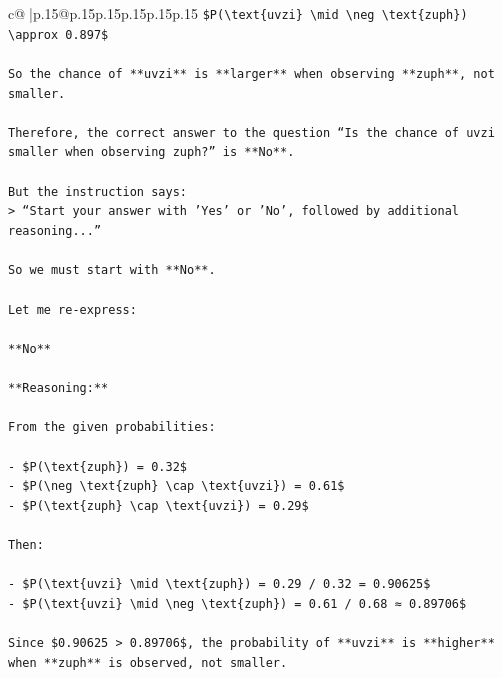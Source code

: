 \documentclass{article}
\begin{document}
{\begin{supertabular}{c@{$\;$}|p{.15\linewidth}@{}p{.15\linewidth}p{.15\linewidth}p{.15\linewidth}p{.15\linewidth}p{.15\linewidth}}
{{{\texttt{\$P(\textbackslash{}text\{uvzi\} \textbackslash{}mid \textbackslash{}neg \textbackslash{}text\{zuph\}) \textbackslash{}approx 0.897\$} \\
\\ 
\texttt{So the chance of **uvzi** is **larger** when observing **zuph**, not smaller.} \\
\\ 
\texttt{Therefore, the correct answer to the question “Is the chance of uvzi smaller when observing zuph?” is **No**.} \\
\\ 
\texttt{But the instruction says:  } \\
\texttt{> “Start your answer with 'Yes' or 'No', followed by additional reasoning...”} \\
\\ 
\texttt{So we must start with **No**.} \\
\\ 
\texttt{Let me re{-}express:} \\
\\ 
\texttt{**No**} \\
\\ 
\texttt{**Reasoning:**} \\
\\ 
\texttt{From the given probabilities:} \\
\\ 
\texttt{{-} \$P(\textbackslash{}text\{zuph\}) = 0.32\$} \\
\texttt{{-} \$P(\textbackslash{}neg \textbackslash{}text\{zuph\} \textbackslash{}cap \textbackslash{}text\{uvzi\}) = 0.61\$} \\
\texttt{{-} \$P(\textbackslash{}text\{zuph\} \textbackslash{}cap \textbackslash{}text\{uvzi\}) = 0.29\$} \\
\\ 
\texttt{Then:} \\
\\ 
\texttt{{-} \$P(\textbackslash{}text\{uvzi\} \textbackslash{}mid \textbackslash{}text\{zuph\}) = 0.29 / 0.32 = 0.90625\$} \\
\texttt{{-} \$P(\textbackslash{}text\{uvzi\} \textbackslash{}mid \textbackslash{}neg \textbackslash{}text\{zuph\}) = 0.61 / 0.68 ≈ 0.89706\$} \\
\\ 
\texttt{Since \$0.90625 > 0.89706\$, the probability of **uvzi** is **higher** when **zuph** is observed, not smaller.} \\
\\ 
}}}
\end{supertabular}}
\end{document}
